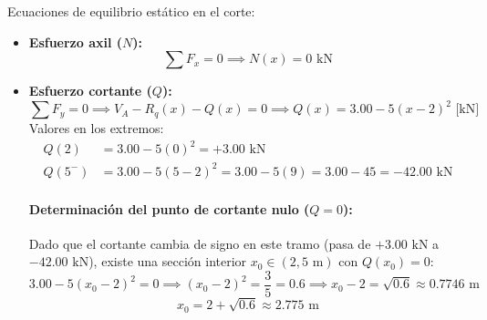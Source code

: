 Ecuaciones de equilibrio estático en el corte:
\begin{itemize}
    \item \textbf{Esfuerzo axil ($N$):}
          \begin{equation}
              \sum F_x = 0 \implies \boxed{N(x) = 0\text{ kN}}
          \end{equation}

    \item \textbf{Esfuerzo cortante ($Q$):}
          \begin{equation}
              \sum F_y = 0 \implies V_A - R_q(x) - Q(x) = 0 \implies \boxed{Q(x) = 3.00 - 5(x - 2)^2\text{ [kN]}}
          \end{equation}
          Valores en los extremos:
          \begin{align*}
              Q(2)   & = 3.00 - 5(0)^2 = \boxed{+3.00\text{ kN}}                                \\
              Q(5^-) & = 3.00 - 5(5 - 2)^2 = 3.00 - 5(9) = 3.00 - 45 = \boxed{-42.00\text{ kN}}
          \end{align*}

          \paragraph{Determinación del punto de cortante nulo ($Q = 0$):}
          Dado que el cortante cambia de signo en este tramo (pasa de $+3.00\text{ kN}$ a $-42.00\text{ kN}$), existe una sección interior $x_0 \in (2, 5\text{ m})$ con $Q(x_0) = 0$:
          \begin{equation}
              3.00 - 5(x_0 - 2)^2 = 0 \implies (x_0 - 2)^2 = \frac{3}{5} = 0.6 \implies x_0 - 2 = \sqrt{0.6} \approx 0.7746\text{ m}
          \end{equation}
          \begin{equation}
              \boxed{x_0 = 2 + \sqrt{0.6} \approx 2.775\text{ m}}
          \end{equation}


\end{itemize}
